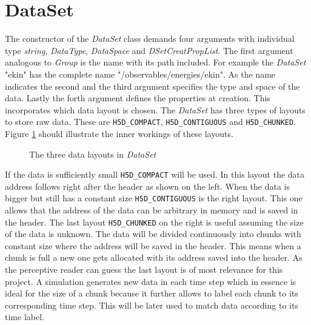 \section{DataSet}
\label{seq:dataset}
The constructor of the \textit{DataSet} class demands four arguments with individual type \textit{string}, \textit{DataType}, \textit{DataSpace} and \textit{DSetCreatPropList}. The first argument analogous to \textit{Group} is the name with its path included. For example the \textit{DataSet} "ekin" has the complete name "/observables/energies/ekin". As the name indicates the second and the third argument specifies the type and space of the data. Lastly the forth argument defines the properties at creation. This incorporates which data layout is chosen. The \textit{DataSet} has three types of layouts to store raw data. These are \texttt{H5D\_COMPACT}, \texttt{H5D\_CONTIGUOUS} and \texttt{H5D\_CHUNKED}. Figure \ref{fig:datalayout} should illustrate the inner workings of these layouts.

\begin{figure}[ht!]
\caption{The three data layouts in \textit{DataSet}}
\label{fig:datalayout}
\end{figure}

If the data is sufficiently small \texttt{H5D\_COMPACT} will be used. In this layout the data address follows right after the header as shown on the left. When the data is bigger but still has a constant size \texttt{H5D\_CONTIGUOUS} is the right layout. This one allows that the address of the data can be arbitrary in memory and is saved in the header. The last layout \texttt{H5D\_CHUNKED} on the right is useful assuming the size of the data is unknown. The data will be divided continuously into chunks with constant size where the address will be saved in the header. This means when a chunk is full a new one gets allocated with its address saved into the header. As the perceptive reader can guess the last layout is of most relevance for this project. A simulation generates new data in each time step which in essence is ideal for the size of a chunk because it further allows to label each chunk to its corresponding time step. This will be later used to match data according to its time label.


